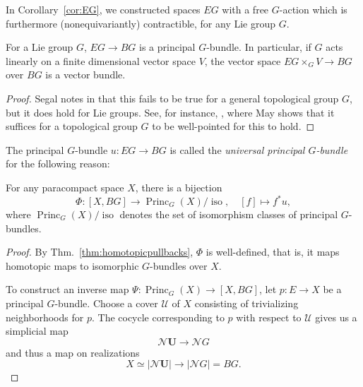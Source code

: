 \documentclass[a4paper,openany]{scrbook}
\DeclareMathOperator{\Princ}{Princ}
\newcommand{\nerve}{\mathcal N}
\begin{document}
In Corollary~\ref{cor:EG}, we constructed spaces $EG$ with a free $G$-action which is furthermore (nonequivariantly) contractible, for any Lie group $G$. 

\begin{lemma}
For a Lie group $G$, $EG \to BG$ is a principal $G$-bundle. In particular, if $G$ acts linearly on a finite dimensional vector space $V$, the vector space $EG \times_G V \to BG$ over $BG$ is a vector bundle.
\end{lemma}
\begin{proof}
Segal notes in \cite{segal:68} that this fails to be true for a general topological group $G$, but it does hold for Lie groups. See, for instance, \cite{may:classifying-spaces}, where May shows that it suffices for a topological group $G$ to be well-pointed for this to hold.
\end{proof}

The principal $G$-bundle $u\colon EG \to BG$ is called the \emph{universal principal $G$-bundle} for the following reason:

\begin{thm}\label{thm:classifying-space}
For any paracompact space $X$, there is a bijection
\[
\Phi\colon [X,BG] \to \Princ_G(X)/\operatorname{iso}, \quad [f] \mapsto f^*u,
\]
where $\Princ_G(X)/\operatorname{iso}$ denotes the set of isomorphism classes of principal $G$-bundles.
\end{thm}
\begin{proof}
By Thm.~\ref{thm:homotopicpullbacks}, $\Phi$ is well-defined, that is, it maps homotopic maps to isomorphic $G$-bundles over $X$.

To construct an inverse map $\Psi\colon \Princ_G(X) \to [X,BG]$, let $p\colon E \to X$ be a principal $G$-bundle. Choose a cover $\mathcal U$ of $X$ consisting of trivializing neighborhoods for $p$. The cocycle corresponding to $p$ with respect to $\mathcal U$ gives us a simplicial map
\[
\nerve \mathbf U \to \nerve G
\]
and thus a map on realizations
\[
X \simeq |\nerve\mathbf U| \to |\nerve G| = BG.
\]
\end{proof}
\end{document}
